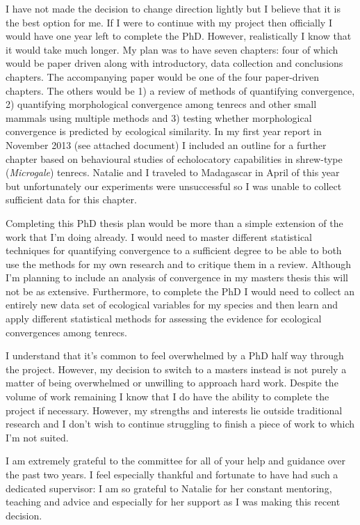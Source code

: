 \documentclass[12pt,a4paper]{article}
\begin{document}
	I have not made the decision to change direction lightly but I believe that it is the best option for me. If I were to continue with my project then officially I would have one year left to complete the PhD. However, realistically I know that it would take much longer. My plan was to have seven chapters: four of which would be paper driven along with introductory, data collection and conclusions chapters. The accompanying paper would be one of the four paper-driven chapters. The others would be 1) a review of methods of quantifying convergence, 2) quantifying morphological convergence among tenrecs and other small mammals using multiple methods and 3) testing whether morphological convergence is predicted by ecological similarity. In my first year report in November 2013 (see attached document) I included an outline for a further chapter based on behavioural studies of echolocatory capabilities in shrew-type (\textit{Microgale}) tenrecs. Natalie and I traveled to Madagascar in April of this year but unfortunately our experiments were unsuccessful so I was unable to collect sufficient data for this chapter.

	Completing this PhD thesis plan would be more than a simple extension of the work that I'm doing already. I would need to master different statistical techniques for quantifying convergence to a sufficient degree to be able to both use the methods for my own research and to critique them in a review. Although I'm planning to include an analysis of convergence in my masters thesis this will not be as extensive. Furthermore, to complete the PhD I would need to collect an entirely new data set of ecological variables for my species and then learn and apply different statistical methods for assessing the evidence for ecological convergences among tenrecs.

	I understand that it's common to feel overwhelmed by a PhD half way through the project. However, my decision to switch to a masters instead is not purely a matter of being overwhelmed or unwilling to approach hard work. Despite the volume of work remaining I know that I do have the ability to complete the project if necessary. However, my strengths and interests lie outside traditional research and I don't wish to continue struggling to finish a piece of work to which I'm not suited.

	I am extremely grateful to the committee for all of your help and guidance over the past two years. I feel especially thankful and fortunate to have had such a dedicated supervisor: I am so grateful to Natalie for her constant mentoring, teaching and advice and especially for her support as I was making this recent decision.  %
\end{document}
